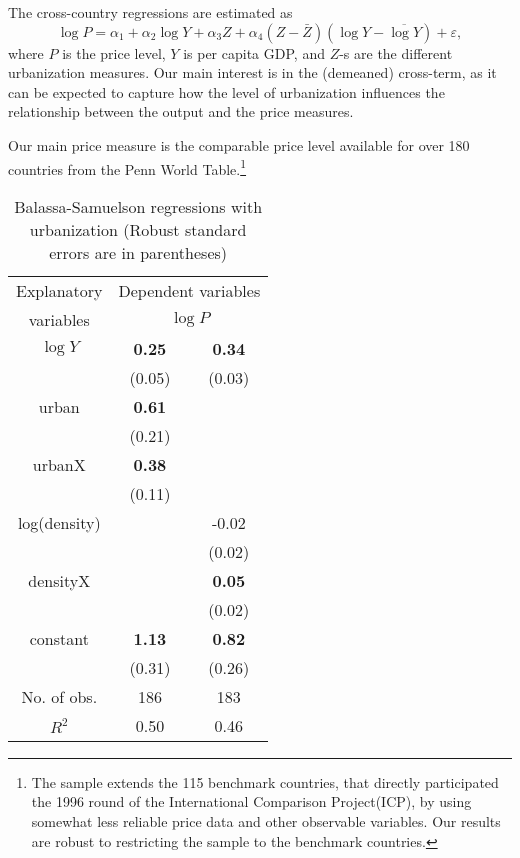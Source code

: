 \documentclass[12pt]{article}
\begin{document}
The cross-country regressions are estimated as
\begin{equation}
\log{P}=\alpha_1+\alpha_2\log Y+\alpha_3Z+\alpha_4(Z-\bar{Z})(\log Y-\overline{\log Y})+\varepsilon,
\end{equation}
where $P$ is the price level, $Y$ is per capita GDP, and $Z$-s are the different urbanization measures. Our main interest is in the (demeaned) cross-term, as it can be expected to capture how the level of urbanization influences the relationship between the output and the price measures.

Our main price measure is the comparable price level available for
over 180 countries from the Penn World Table.\footnote{The sample
extends the 115 benchmark countries, that directly participated the
1996 round of the International Comparison Project(ICP), by using
somewhat less reliable price data and other observable variables.
Our results are robust to restricting the sample to the benchmark
countries.} 

\begin{table}[h!]
\caption{Balassa-Samuelson regressions with urbanization (Robust
standard errors are in parentheses)} \center \label{tab:BS}
\begin{tabular}{c|cc}
  \hline\hline
  Explanatory & \multicolumn{2}{c}{Dependent variables} \\
  variables &\multicolumn{2}{c}{$\log P$} \\ \hline
  $\log Y$ & \textbf{0.25} & \textbf{0.34} \\
           & (0.05)        & (0.03)        \\
  urban    & \textbf{0.61} &               \\
           & (0.21)        &               \\
  urbanX   & \textbf{0.38} &               \\
           & (0.11)        &               \\
  log(density) &           & -0.02         \\
             &             & (0.02)        \\
  densityX &               & \textbf{0.05} \\
           &               & (0.02)        \\
  constant & \textbf{1.13} & \textbf{0.82} \\
           & (0.31)        & (0.26)        \\ \hline
  No. of obs. & 186        & 183           \\
  $R^2$    & 0.50          & 0.46          \\
  \hline\hline
\end{tabular}
\end{table}
\end{document}
